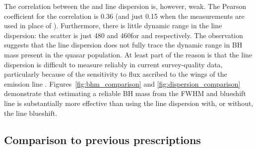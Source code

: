The correlation between the \ha and  line dispersion is, however, weak. 
The Pearson coefficient for the correlation is 0.36 (and just 0.15 when the \hb measurements are used in place of \hans). 
Furthermore, there is little dynamic range in the line dispersion: the scatter is just 480 and 460\kms for \ha and  respectively. 
The observation suggests that the line dispersion does not fully trace the dynamic range in BH mass present in the quasar population. 
At least part of the reason is that the line dispersion is difficult to measure reliably in current survey-quality data, particularly because of the sensitivity to flux ascribed to the wings of the emission line \citep[e.g.][]{mejia-restrepo16}.
Figures~\ref{fig:bhm_comparison} and \ref{fig:dispersion_comparison} demonstrate that estimating a reliable BH mass from the  FWHM and blueshift line is substantially more effective than using the  line dispersion with, or without, the line blueshift. 

\subsection{Comparison to previous prescriptions}

